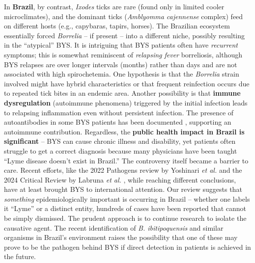 \documentclass[11pt,letterpaper]{article}
\begin{document}
In \textbf{Brazil}, by contrast, \textit{Ixodes} ticks are rare (found only in limited cooler microclimates), and the dominant ticks (\textit{Amblyomma cajennense} complex) feed on different hosts (e.g., capybaras, tapirs, horses). The Brazilian ecosystem essentially forced \textit{Borrelia} – if present – into a different niche, possibly resulting in the “atypical” BYS. It is intriguing that BYS patients often have \textit{recurrent} symptoms; this is somewhat reminiscent of \textit{relapsing fever} borreliosis, although BYS relapses are over longer intervals (months) rather than days and are not associated with high spirochetemia. One hypothesis is that the \textit{Borrelia} strain involved might have hybrid characteristics or that frequent reinfection occurs due to repeated tick bites in an endemic area. Another possibility is that \textbf{immune dysregulation} (autoimmune phenomena) triggered by the initial infection leads to relapsing inflammation even without persistent infection. The presence of autoantibodies in some BYS patients has been documented \citep{Yoshinari2022ak}, supporting an autoimmune contribution. Regardless, the \textbf{public health impact in Brazil is significant} – BYS can cause chronic illness and disability, yet patients often struggle to get a correct diagnosis because many physicians have been taught “Lyme disease doesn’t exist in Brazil.” The controversy itself became a barrier to care. Recent efforts, like the 2022 Pathogens review by Yoshinari \textit{et al.} \citep{Yoshinari2022al, Yoshinari2022am} and the 2024 Critical Review by Labruna \textit{et al.} \citep{Labruna2024c, Labruna2024d}, while reaching different conclusions, have at least brought BYS to international attention. Our review suggests that \textit{something} epidemiologically important is occurring in Brazil – whether one labels it “Lyme” or a distinct entity, hundreds of cases have been reported that cannot be simply dismissed. The prudent approach is to continue research to isolate the causative agent. The recent identification of \textit{B. ibitipoquensis} and similar organisms in Brazil’s environment raises the possibility that one of these may prove to be the pathogen behind BYS if direct detection in patients is achieved in the future.
\end{document}

